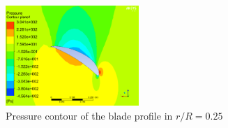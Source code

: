 \begin{figure}[H]
  \includegraphics[width=0.45\textwidth]{fig1}
\caption{Pressure contour of the blade profile in $r/R=0.25$}
\label{fig:4}       %
\end{figure}

